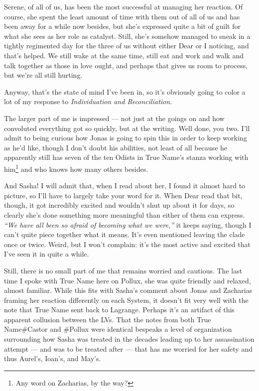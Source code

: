 Serene, of all of us, has been the most successful at managing her reaction. Of course, she spent the least amount of time with them out of all of us and has been away for a while now besides, but she's expressed quite a bit of guilt for what she sees as her role as catalyst. Still, she's somehow managed to sneak in a tightly regimented day for the three of us without either Dear or I noticing, and that's helped. We still wake at the same time, still eat and work and walk and talk together as those in love ought, and perhaps that gives us room to process, but we're all still hurting.

Anyway, that's the state of mind I've been in, so it's obviously going to color a lot of my response to \emph{Individuation and Reconciliation}.

The larger part of me is impressed — not just at the goings on and how convoluted everything got so quickly, but at the writing. Well done, you two. I'll admit to being curious how Jonas is going to spin this in order to keep working as he'd like, though I don't doubt his abilities, not least of all because he apparently still has seven of the ten Odists in True Name's stanza working with him\footnote{Any word on Zacharias, by the way?} and who knows how many others besides.

And Sasha! I will admit that, when I read about her, I found it almost hard to picture, so I'll have to largely take your word for it. When Dear read that bit, though, it got incredibly excited and wouldn't shut up about it for days, so clearly she's done something more meaningful than either of them can express. \emph{``We have all been so afraid of becoming what we were,''} it keeps saying, though I can't quite piece together what it means. It's even mentioned leaving the clade once or twice. Weird, but I won't complain: it's the most active and excited that I've seen it in quite a while.

Still, there is no small part of me that remains worried and cautious. The last time I spoke with True Name here on Pollux, she was quite friendly and relaxed, almost familiar. While this fits with Sasha's comment about Jonas and Zacharias framing her reaction differently on each System, it doesn't fit very well with the note that True Name sent back to Lagrange. Perhaps it's an artifact of this apparent collusion between the LVs. That the notes from both True Name\#Castor and \#Pollux were identical bespeaks a level of organization surrounding how Sasha was treated in the decades leading up to her assassination attempt — and was to be treated after — that has me worried for her safety and thus Aurel's, Ioan's, and May's.


